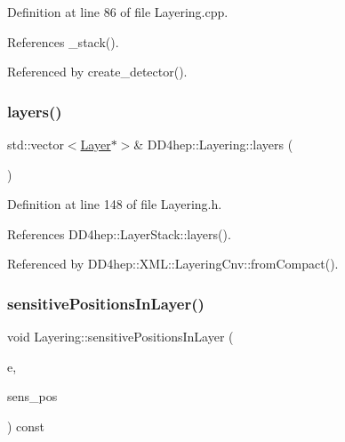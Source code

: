 Definition at line 86 of file Layering.\+cpp.



References \+\_\+stack().



Referenced by create\+\_\+detector().

\hypertarget{class_d_d4hep_1_1_layering_ab6b0103b1e2d3f16f3a423e9cf73c32b}{}\label{class_d_d4hep_1_1_layering_ab6b0103b1e2d3f16f3a423e9cf73c32b} 
\subsubsection{\texorpdfstring{layers()}{layers()}}
{\footnotesize\ttfamily std\+::vector$<$\hyperlink{class_d_d4hep_1_1_layer}{Layer}$\ast$$>$\& D\+D4hep\+::\+Layering\+::layers (\begin{DoxyParamCaption}{ }\end{DoxyParamCaption})\hspace{0.3cm}{\ttfamily [inline]}}



Definition at line 148 of file Layering.\+h.



References D\+D4hep\+::\+Layer\+Stack\+::layers().



Referenced by D\+D4hep\+::\+X\+M\+L\+::\+Layering\+Cnv\+::from\+Compact().

\hypertarget{class_d_d4hep_1_1_layering_aa2bc4598151a84dc5ccdd0b09a5de6b3}{}\label{class_d_d4hep_1_1_layering_aa2bc4598151a84dc5ccdd0b09a5de6b3} 
\subsubsection{\texorpdfstring{sensitive\+Positions\+In\+Layer()}{sensitivePositionsInLayer()}}
{\footnotesize\ttfamily void Layering\+::sensitive\+Positions\+In\+Layer (\begin{DoxyParamCaption}\item[{\hyperlink{class_d_d4hep_1_1_x_m_l_1_1_element}{X\+M\+L\+::\+Element}}]{e,  }\item[{std\+::vector$<$ double $>$ \&}]{sens\+\_\+pos }\end{DoxyParamCaption}) const}



